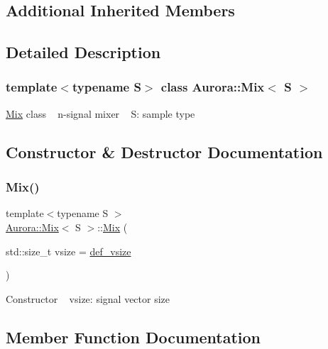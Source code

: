 \subsection*{Additional Inherited Members}


\subsection{Detailed Description}
\subsubsection*{template$<$typename S$>$\newline
class Aurora\+::\+Mix$<$ S $>$}

\hyperlink{class_aurora_1_1_mix}{Mix} class ~\newline
n-\/signal mixer ~\newline
S\+: sample type 

\subsection{Constructor \& Destructor Documentation}
\mbox{\label{class_aurora_1_1_mix_aa3b9e9322e58a0b47d4ed3a12fbe2b94}} 
\subsubsection{\texorpdfstring{Mix()}{Mix()}}
{\footnotesize\ttfamily template$<$typename S $>$ \\
\hyperlink{class_aurora_1_1_mix}{Aurora\+::\+Mix}$<$ S $>$\+::\hyperlink{class_aurora_1_1_mix}{Mix} (\begin{DoxyParamCaption}\item[{std\+::size\+\_\+t}]{vsize = {\ttfamily \hyperlink{namespace_aurora_afaaddf667a06e7ce23c667a8b7295263}{def\+\_\+vsize}} }\end{DoxyParamCaption})\hspace{0.3cm}{\ttfamily [inline]}}

Constructor ~\newline
vsize\+: signal vector size 

\subsection{Member Function Documentation}
\mbox{\label{class_aurora_1_1_mix_ad9ea4686dddb338fcb03519e4e385a1d}} 
